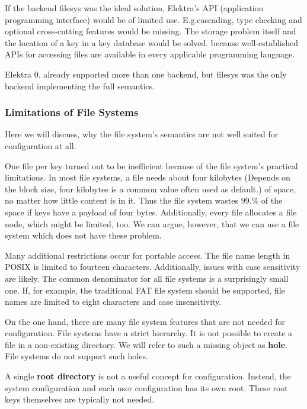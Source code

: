 If the backend {\ttfamily filesys} was the ideal solution, Elektra's A\+P\+I (application programming interface) would be of limited use. E.\+g.\+cascading, type checking and optional cross-\/cutting features would be missing. The storage problem itself and the location of a key in a key database would be solved. because well-\/established A\+P\+Is for accessing files are available in every applicable programming language.

Elektra 0. already supported more than one backend, but {\ttfamily filesys} was the only backend implementing the full semantics.

\subsubsection*{Limitations of File Systems}

Here we will discuss, why the file system's semantics are not well suited for configuration at all.

One file per key turned out to be inefficient because of the file system's practical limitations. In most file systems, a file needs about four kilobytes (Depends on the block size, four kilobytes is a common value often used as default.) of space, no matter how little content is in it. Thus the file system wastes 99.\% of the space if keys have a payload of four bytes. Additionally, every file allocates a file node, which might be limited, too. We can argue, however, that we can use a file system which does not have these problem.

Many additional restrictions occur for portable access. The file name length in P\+O\+S\+I\+X is limited to fourteen characters. Additionally, issues with case sensitivity are likely. The common denominator for all file systems is a surprisingly small one. If, for example, the traditional F\+A\+T file system should be supported, file names are limited to eight characters and case insensitivity.

On the one hand, there are many file system features that are not needed for configuration. File systems have a strict hierarchy. It is not possible to create a file in a non-\/existing directory. We will refer to such a missing object as {\bfseries hole}. File systems do not support such holes.

A single {\bfseries root directory} is not a useful concept for configuration. Instead, the system configuration and each user configuration has its own root. These root keys themselves are typically not needed.

